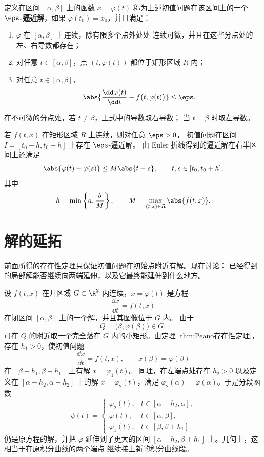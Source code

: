\begin{definition}\label{def:epsilon逼近解}
	定义在区间 $[\alpha,\beta]$ 上的函数 $x=\varphi(t)$
	称为上述初值问题在该区间上的一个 \textbf{$\eps$-逼近解}，如果
	$\varphi(t_0)=x_0$，并且满足：
	\begin{enumerate}
		\item $\varphi$ 在 $[\alpha,\beta]$ 上连续，除有限多个点外处处
			连续可微，并且在这些分点处的左、右导数都存在；
		\item 对任意 $t\in[\alpha,\beta]$，点
			$(t,\varphi(t))$ 都位于矩形区域 $R$ 内；
		\item 对任意 $t\in[\alpha,\beta]$，
			\[
				\abs{
					\dfrac{\dd\varphi(t)}{\dd t}
					-f\bigl(t,\varphi(t)\bigr)
				}\leq\eps.
			\]
	\end{enumerate}
	在不可微的分点处，若 $t\neq\beta$，上式中的导数取右导数；
	当 $t=\beta$ 时取左导数。
\end{definition}

\begin{proposition}\label{prop:Peano条件下epsilon逼近解的存在性}
	若 $f(t,x)$ 在矩形区域 $R$ 上连续，则对任意 $\eps>0$，
	初值问题在区间 $I=[t_0-h,t_0+h]$ 上存在 $\eps$-逼近解。
	由 Euler 折线得到的逼近解在右半区间上还满足
	\[
		\abs{\varphi(t)-\varphi(s)}
		\leq M\abs{t-s},
		\qquad t,s\in[t_0,t_0+h],
	\]
	其中
	\[
		h=\min\left\{a,\dfrac{b}{M}\right\},
		\qquad
		M=\max_{(t,x)\in R}\abs{f(t,x)}.
	\]
\end{proposition}

\section{解的延拓}\label{sec:解的延拓}

前面所得的存在性定理只保证初值问题在初始点附近有解。现在讨论：
已经得到的局部解能否继续向两端延伸，以及它最终能延伸到什么地方。

设 $f(t,x)$ 在开区域 $G\subset\R^2$ 内连续，$x=\varphi(t)$
是方程
\[
	\dfrac{\dd x}{\dd t}=f(t,x)
\]
在闭区间 $[\alpha,\beta]$ 上的一个解，并且其图像位于 $G$ 内。
由于
\[
	Q=\bigl(\beta,\varphi(\beta)\bigr)\in G,
\]
可在 $Q$ 的附近取一个完全落在 $G$ 内的小矩形。由定理
\ref{thm:Peano存在性定理}，
存在 $h_1>0$，使初值问题
\[
	\dfrac{\dd x}{\dd t}=f(t,x),
	\qquad x(\beta)=\varphi(\beta)
\]
在 $[\beta-h_1,\beta+h_1]$ 上有解 $x=\varphi_1(t)$。
同理，在左端点处存在 $h_2>0$ 以及定义在
$[\alpha-h_2,\alpha+h_2]$ 上的解 $x=\varphi_2(t)$，满足
$\varphi_2(\alpha)=\varphi(\alpha)$。于是分段函数
\[
	\psi(t)=
	\begin{cases}
		\varphi_2(t), & t\in[\alpha-h_2,\alpha],\\
		\varphi(t),   & t\in[\alpha,\beta],\\
		\varphi_1(t), & t\in[\beta,\beta+h_1]
	\end{cases}
\]
仍是原方程的解，并把 $\varphi$ 延伸到了更大的区间
$[\alpha-h_2,\beta+h_1]$ 上。几何上，这相当于在原积分曲线的两个端点
继续接上新的积分曲线段。

